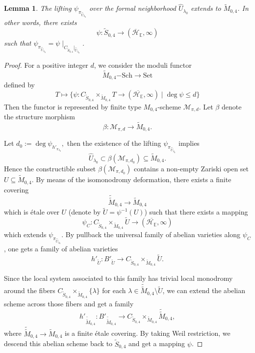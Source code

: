 \documentclass[12pt,twoside]{book}
\theoremstyle{plain}
\newtheorem{lemma}[lemma]{Lemma}
\theoremstyle{definition}
\theoremstyle{remark}
\numberwithin{equation}{section}
\def\EK{{\mathbb E}}
\begin{document}
\begin{lemma}
The lifting $\psi_{\pi_{\hat U_{\lambda_0}}}$ over the formal neighborhood $\hat U_{\lambda_0}$ extends to $\widetilde{M}_{0,4}$. In other words, there exists
\[\psi \colon \widetilde S_{0,4} \to (\overline{\mathcal H}_{\EK},\infty)\]
such that $\psi_{\pi_{\hat U_{\lambda_0}}} = \psi\mid_{ C_{\widetilde S_{0,4}}|_{\hat U_{\lambda_0}}}$.
\end{lemma}
\begin{proof}
For a positive integer $d$, we consider the moduli functor
\begin{equation*}
\widetilde{M}_{0,4}\mathrm{-Sch} \longrightarrow \mathrm{Set}
\end{equation*}
defined by
\[T \mapsto \{\psi\colon C_{\widetilde{S}_{0,4}}\times_{\widetilde{M}_{0,4}} T \rightarrow (\overline{\mathcal H_{\EK}},\infty) \mid \deg\psi\leq d\}\]
Then the functor is represented by finite type $M_{0,4}$-scheme $\mathcal M_{\pi,d}$. Let $\beta$ denote the structure morphism
\[\beta: \mathcal M_{\pi,d}\to \widetilde{M}_{0,4}.\]

Let $d_0:=\deg \psi_{h'_{\pi_{\lambda_0}}},$ then the existence of the lifting $\psi_{\pi_{\hat U_{\lambda_0}}}$ implies
\[\hat U_{\lambda_0}\subset \beta(\mathcal M_{\pi,d_0})\subseteq \widetilde{M}_{0,4}.\]
Hence the constructible
subset $\beta(\mathcal M_{\pi,d_0})$ contains a non-empty Zariski open set $U\subseteq \widetilde{M}_{0,4}$. By means of the isomonodromy deformation, there exists a finite covering
\[\widetilde{\widetilde{M}}_{0,4}\rightarrow \widetilde{M}_{0,4}\]
which is \'etale over $U$ (denote by $\widetilde{U}=\psi^{-1}(U)$)
such that there exists a mapping
\[\psi_C \colon C_{\widetilde{S}_{0,4}} \times_{\widetilde{M}_{0,4}} \widetilde{U} \rightarrow (\overline{\mathcal H_{\EK}},\infty)\]
which extends $\psi_{\pi_{\hat U_{\lambda_0}}}$. By pullback the universal family of abelian varieties along $\psi_C$, one gets a family of abelian varieties \[h'_{\widetilde U}: B'_{\widetilde U}\to C_{\widetilde{S}_{0,4}} \times_{\widetilde{M}_{0,4}} \widetilde{U}.\]

Since the local system associated to this family has trivial local monodromy around the fibers $C_{\widetilde{S}_{0,4}} \times_{\widetilde{M}_{0,4}} \{\lambda\}$ for each $\lambda \in \widetilde{\widetilde{M}}_{0,4}\setminus \widetilde{U}$, we can extend the abelian scheme across those fibers and get a family
\[h'_{\widetilde{\widetilde{M}}_{0,4}}: B'_{\widetilde{\widetilde{M}}_{0,4}} \to C_{\widetilde{S}_{0,4}} \times_{\widetilde{M}_{0,4}} \widetilde{\widetilde{M}}_{0,4},\]
where $\widetilde{\widetilde M}_{0,4}\to \widetilde{M}_{0,4}$ is a finite \'etale covering. By taking Weil restriction, we descend
this abelian scheme back to $\widetilde{S}_{0,4}$ and get a mapping $\psi$.
\end{proof}
\end{document}
